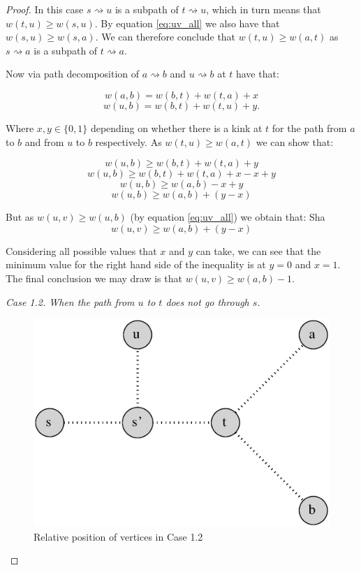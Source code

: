 \begin{proof}
In this case $s \rightsquigarrow u$ is a subpath of $t \rightsquigarrow u$, which in turn means that $w(t, u) \ge w(s, u)$. By equation \ref{eq:uv_all} we also have that $w(s, u) \ge w(s, a)$. We can therefore conclude that $w(t, u) \ge w(a, t)$ as $s \rightsquigarrow a$ is a subpath of $t \rightsquigarrow a$.

Now via path decomposition of $a \rightsquigarrow b$ and $u \rightsquigarrow b$ at $t$ have that:

$$ w(a, b) = w(b, t) + w(t, a) + x  $$
$$ w(u, b) = w(b, t) + w(t, u) + y .$$

Where $x, y \in \{0, 1\}$ depending on whether there is a kink at $t$ for the path from $a$ to $b$ and from $u$ to $b$ respectively. As $w(t, u) \ge w(a, t)$ we can show that:


$$ w(u, b) \ge w(b, t) + w(t, a) + y $$
$$ w(u, b) \ge w(b, t) + w(t, a) + x - x + y $$
$$ w(u, b) \ge w(a, b) - x + y $$
$$ w(u, b) \ge w(a, b) + (y - x) $$

But as $w(u, v) \ge w(u, b)$ (by equation \ref{eq:uv_all}) we obtain that: Sha
$$ w(u, v) \ge w(a, b) + (y - x) $$

Considering all possible values that $x$ and $y$ can take, we can see that the minimum value for the right hand side of the inequality is at $y = 0$ and $x = 1$. The final conclusion we may draw is that $w(u, v) \ge w(a, b) -1$.




{\em Case 1.2. When the path from $u$ to $t$ does not go through $s$.}

\begin{figure}%
    \centering
    \includegraphics[center, scale=0.5 ]{./images/2xbfs-case-1-2.eps}
    \caption{Relative position of vertices in Case 1.2 }%
    \label{fig:case1.2}%
\end{figure}


\end{proof}

